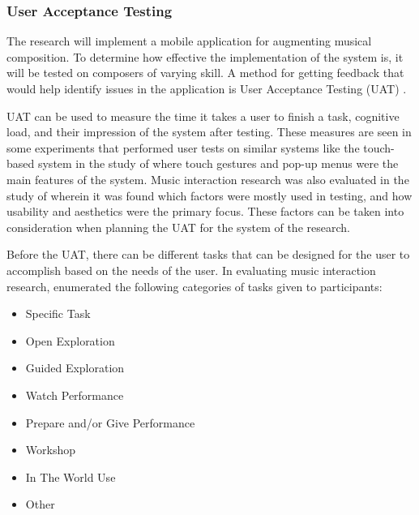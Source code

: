 		\subsubsection{User Acceptance Testing}
        
        The research will implement a mobile application for augmenting musical composition. To determine how effective the implementation of the system is, it will be tested on composers of varying skill. A method for getting feedback that would help identify issues in the application is User Acceptance Testing (UAT) \citep{davis2004toward}.
        
        
        UAT can be used to measure the time it takes a user to finish a task, cognitive load, and their impression of the system after testing. These measures are seen in some experiments that performed user tests on similar systems like the touch-based system in the study of \citet{findlater2012beyond} where touch gestures and pop-up menus were the main features of the system. Music interaction research was also evaluated in the study of \citet{brown2017user} wherein it was found which factors were mostly used in testing, and how usability and aesthetics were the primary focus. These factors can be taken into consideration when planning the UAT for the system of the research.
        
        Before the UAT, there can be different tasks that can be designed for the user to accomplish based on the needs of the user. In evaluating music interaction research, \citet{brown2017user} enumerated the following categories of tasks given to participants:
        
        \begin{itemize}
        \item Specific Task
        \item Open Exploration
        \item Guided Exploration
        \item Watch Performance
        \item Prepare and/or Give Performance
        \item Workshop
        \item In The World Use
        \item Other
        \end{itemize}
        
